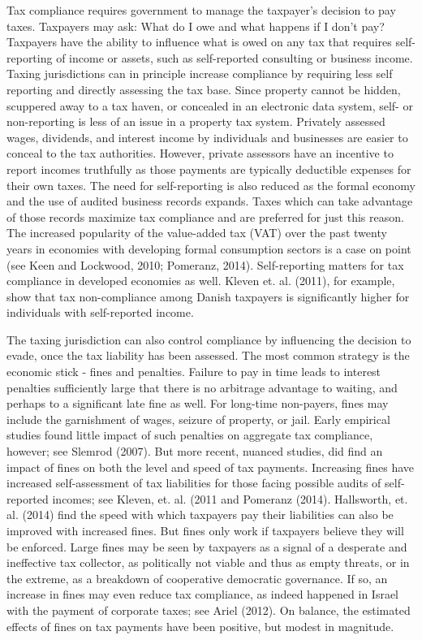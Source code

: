 \documentclass[12pt,titlepage]{article}
\begin{document}
Tax compliance requires government to manage the taxpayer's decision
to pay taxes.  Taxpayers may ask: What do I owe and what happens if I
don't pay?  Taxpayers have the ability to influence what is owed on
any tax that requires self-reporting of income or assets, such as
self-reported consulting or business income.  Taxing jurisdictions can
in principle increase compliance by requiring less self reporting and
directly assessing the tax base.  Since property cannot be hidden,
scuppered away to a tax haven, or concealed in an electronic data
system, self- or non-reporting is less of an issue in a property tax
system.  Privately assessed wages, dividends, and interest income by
individuals and businesses are easier to conceal to the tax
authorities.  However, private assessors have an incentive to report
incomes truthfully as those payments are typically deductible expenses
for their own taxes.  The need for self-reporting is also reduced as
the formal economy and the use of audited business records expands.
Taxes which can take advantage of those records maximize tax
compliance and are preferred for just this reason.  The increased
popularity of the value-added tax (VAT) over the past twenty years in
economies with developing formal consumption sectors is a case on
point (see Keen and Lockwood, 2010; Pomeranz, 2014).  Self-reporting
matters for tax compliance in developed economies as well.  Kleven
et. al. (2011), for example, show that tax non-compliance among Danish
taxpayers is significantly higher for individuals with self-reported
income.

The taxing jurisdiction can also control compliance by influencing the
decision to evade, once the tax liability has been assessed.  The most
common strategy is the economic stick - fines and penalties.  Failure
to pay in time leads to interest penalties sufficiently large that
there is no arbitrage advantage to waiting, and perhaps to a
significant late fine as well.  For long-time non-payers, fines may
include the garnishment of wages, seizure of property, or jail.  Early
empirical studies found little impact of such penalties on aggregate
tax compliance, however; see Slemrod (2007).  But more recent, nuanced
studies, did find an impact of fines on both the level and speed of
tax payments.  Increasing fines have increased self-assessment of tax
liabilities for those facing possible audits of self-reported incomes;
see Kleven, et. al. (2011 and Pomeranz (2014).  Hallsworth, et. al.
(2014) find the speed with which taxpayers pay their liabilities can
also be improved with increased fines.  But fines only work if
taxpayers believe they will be enforced.  Large fines may be seen by
taxpayers as a signal of a desperate and ineffective tax collector, as
politically not viable and thus as empty threats, or in the extreme,
as a breakdown of cooperative democratic governance.  If so, an
increase in fines may even reduce tax compliance, as indeed happened
in Israel with the payment of corporate taxes; see Ariel (2012).  On
balance, the estimated effects of fines on tax payments have been
positive, but modest in magnitude.
\end{document}
